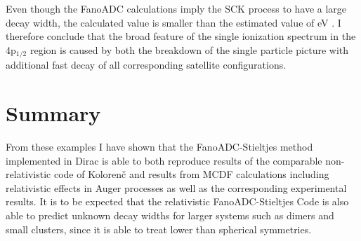 Even though the FanoADC calculations imply the \ac{SCK} process to have
a large decay width, the calculated value is smaller than the estimated
value of \unit[10--100]{eV} \cite{Heinaesmaeki04}.
I therefore conclude that the broad
feature of the single ionization spectrum in the 4p$_{1/2}$ region is caused
by both the breakdown of the single particle picture with additional fast decay
of all corresponding satellite configurations.


\section{Summary}
From these examples I have shown that the FanoADC-Stieltjes method implemented
in Dirac is able to both reproduce results of the comparable non-relativistic
code of Koloren\v{c}  and results from \ac{MCDF} calculations
including relativistic effects in Auger processes as well as the corresponding
experimental results.
It is to be expected that the relativistic FanoADC-Stieltjes Code is also able
to predict unknown decay widths for larger systems such as dimers and small
clusters, since it is able to treat lower than spherical symmetries.
